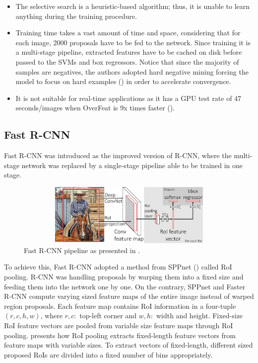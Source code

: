 \begin{itemize}
  \item The selective search is a heuristic-based algorithm; thus, it is unable to learn anything during the training procedure. 
  \item Training time takes a vast amount of time and space, considering that for each image, 2000 proposals have to be fed to the network. Since training it is a multi-stage pipeline, extracted features have to be cached on disk before passed to the SVMs and box regressors. Notice that since the majority of samples are negatives, the authors adopted hard negative mining forcing the model to focus on hard examples (\cite{felzenszwalb2009object}) in order to accelerate convergence.
  \item It is not suitable for real-time applications as it has a GPU test rate of  47 seconds/images when OverFeat is 9x times faster (\cite{girshick2015fast}). 
\end{itemize}

\subsection{Fast R-CNN}
Fast R-CNN was introduced as the improved version of R-CNN, where the multi-stage network was replaced by a single-stage pipeline able to be trained in one stage.

\begin{figure}[!htb]
  \centering
  \includegraphics[width=12cm, height=3cm]{figures/ch2/fig3.png}
  \caption{Fast R-CNN pipeline as presented in \cite{girshick2015fast}.}
  \label{fig3}
\end{figure}

To achieve this, Fast R-CNN adopted a method from SPPnet (\cite{he2015spatial}) called RoI pooling. R-CNN was handling proposals by warping them into a fixed size and feeding them into the network one by one. On the contrary, SPPnet and Faster R-CNN compute varying sized feature maps of the entire image instead of warped region proposals. Each feature map contains RoI information in a four-tuple $(r,c,h,w)$, where $r, c:$ top-left corner and $w, h:$ width and height. Fixed-size RoI feature vectors are pooled from variable size feature maps through RoI pooling.  presents how RoI pooling extracts fixed-length feature vectors from feature maps with variable sizes. To extract vectors of fixed-length, different sized proposed RoIs are divided into a fixed number of bins appropriately.

